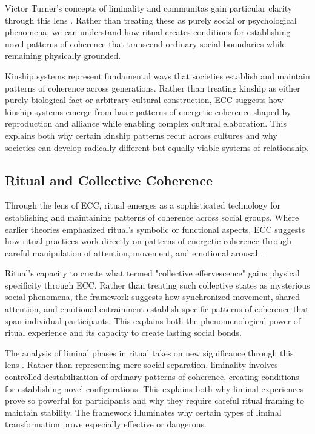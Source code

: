 \begin{refsection}
Victor Turner's concepts of liminality and communitas gain particular clarity through this lens \cite{turner1967forest}. Rather than treating these as purely social or psychological phenomena, we can understand how ritual creates conditions for establishing novel patterns of coherence that transcend ordinary social boundaries while remaining physically grounded.

Kinship systems represent fundamental ways that societies establish and maintain patterns of coherence across generations. Rather than treating kinship as either purely biological fact or arbitrary cultural construction, ECC suggests how kinship systems emerge from basic patterns of energetic coherence shaped by reproduction and alliance while enabling complex cultural elaboration. This explains both why certain kinship patterns recur across cultures and why societies can develop radically different but equally viable systems of relationship.

\subsection{Ritual and Collective Coherence}

Through the lens of ECC, ritual emerges as a sophisticated technology for establishing and maintaining patterns of coherence across social groups. Where earlier theories emphasized ritual's symbolic or functional aspects, ECC suggests how ritual practices work directly on patterns of energetic coherence through careful manipulation of attention, movement, and emotional arousal \cite{turner1969ritual,rappaport1999ritual}.

Ritual's capacity to create what \cite{durkheim1995elementary} termed "collective effervescence" gains physical specificity through ECC. Rather than treating such collective states as mysterious social phenomena, the framework suggests how synchronized movement, shared attention, and emotional entrainment establish specific patterns of coherence that span individual participants. This explains both the phenomenological power of ritual experience and its capacity to create lasting social bonds.

The analysis of liminal phases in ritual takes on new significance through this lens \cite{turner1969ritual}. Rather than representing mere social separation, liminality involves controlled destabilization of ordinary patterns of coherence, creating conditions for establishing novel configurations. This explains both why liminal experiences prove so powerful for participants and why they require careful ritual framing to maintain stability. The framework illuminates why certain types of liminal transformation prove especially effective or dangerous.


\end{refsection}
